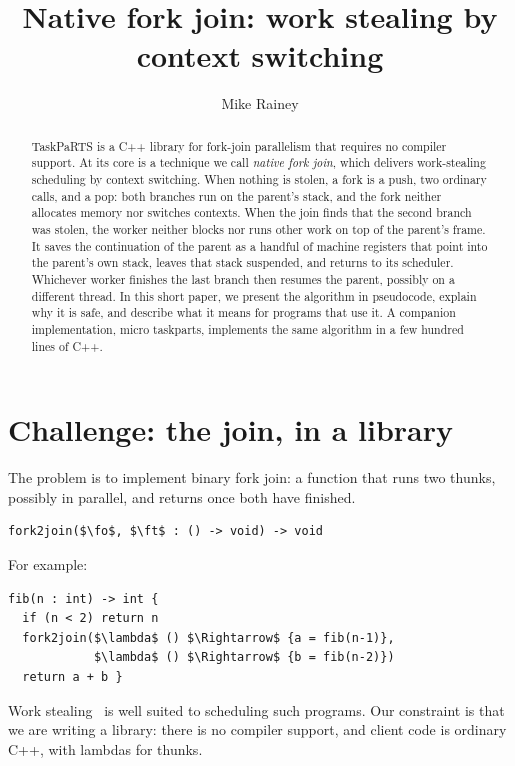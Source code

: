 \documentclass[sigplan,nonacm]{acmart}
\title{Native fork join: work stealing by context switching}
\author{Mike Rainey}
\newcommand{\fo}{\mathtt{f_1}}
\newcommand{\ft}{\mathtt{f_2}}
\begin{document}
\begin{abstract}
TaskPaRTS is a C++ library for fork-join parallelism that requires no
compiler support.
%
At its core is a technique we call \emph{native fork join}, which
delivers work-stealing scheduling by context switching.
%
When nothing is stolen, a fork is a push, two ordinary calls, and a
pop: both branches run on the parent's stack, and the fork neither
allocates memory nor switches contexts.
%
When the join finds that the second branch was stolen, the worker
neither blocks nor runs other work on top of the parent's frame.
%
It saves the continuation of the parent as a handful of machine
registers that point into the parent's own stack, leaves that stack
suspended, and returns to its scheduler.
%
Whichever worker finishes the last branch then resumes the parent,
possibly on a different thread.
%
In this short paper, we present the algorithm in pseudocode, explain
why it is safe, and describe what it means for programs that use it.
%
A companion implementation, micro taskparts, implements the same
algorithm in a few hundred lines of C++.
\end{abstract}

\maketitle

\section{Challenge: the join, in a library}

The problem is to implement binary fork join: a function that runs two
thunks, possibly in parallel, and returns once both have finished.
%
\begin{lstlisting}
fork2join($\fo$, $\ft$ : () -> void) -> void
\end{lstlisting}
%
For example:
%
\begin{lstlisting}
fib(n : int) -> int {
  if (n < 2) return n
  fork2join($\lambda$ () $\Rightarrow$ {a = fib(n-1)},
            $\lambda$ () $\Rightarrow$ {b = fib(n-2)})
  return a + b }
\end{lstlisting}
%
Work stealing~\cite{halstead84,blumofele99} is well suited to
scheduling such programs.
%
Our constraint is that we are writing a library: there is no compiler
support, and client code is ordinary C++, with lambdas for thunks.
\end{document}
